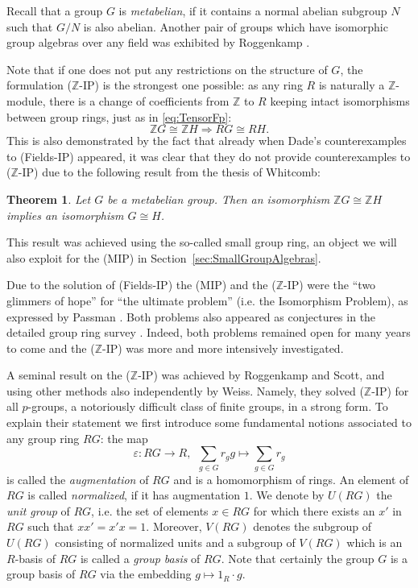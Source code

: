 \documentclass[11pt, a4paper]{amsart}
\newtheorem{theorem}{Theorem}[section]
\theoremstyle{definition}
\begin{document}
Recall that a group $G$ is \emph{metabelian}, if it contains a normal abelian subgroup $N$ such that $G/N$ is also abelian. Another pair of groups which have isomorphic group algebras over any field was exhibited by Roggenkamp \cite[Chapter VIII]{RoggenkampTaylor}.

Note that if one does not put any restrictions on the structure of $G$, the formulation ($\mathbb{Z}$-IP) is the strongest one possible: as any ring $R$ is naturally a $\mathbb{Z}$-module, there is a change of coefficients from $\mathbb{Z}$ to $R$ keeping intact isomorphisms between group rings, just as in \eqref{eq:TensorFp}:
\[\mathbb{Z}G \cong \mathbb{Z}H \Rightarrow RG \cong  RH. \]
This is also demonstrated by the fact that already when Dade's counterexamples to (Fields-IP) appeared, it was clear that they do not provide counterexamples to ($\mathbb{Z}$-IP) due to the following result from the thesis of Whitcomb:

\begin{theorem}\cite{Whitcomb} 
Let $G$ be a metabelian group. Then an isomorphism $\mathbb{Z}G \cong \mathbb{Z}H$ implies an isomorphism $G \cong H$.
\end{theorem}

This result was achieved using the so-called small group ring, an object we will also exploit for the (MIP) in Section~\ref{sec:SmallGroupAlgebras}.

Due to the solution of (Fields-IP) the (MIP) and the ($\mathbb{Z}$-IP) were the ``two glimmers of hope'' for ``the ultimate problem'' (i.e. the Isomorphism Problem), as expressed by Passman \cite{PassmanAlgebraicStructure}. Both problems also appeared as conjectures in the detailed group ring survey \cite{ZalesskiiMihalev73}. Indeed, both problems remained open for many years to come and the ($\mathbb{Z}$-IP) was more and more intensively investigated.

A seminal result on the ($\mathbb{Z}$-IP) was achieved by Roggenkamp and Scott, and using other methods also independently by Weiss. Namely, they solved ($\mathbb{Z}$-IP) for all $p$-groups, a notoriously difficult class of finite groups, in a strong form. To explain their statement we first introduce some fundamental notions associated to any group ring $RG$: the map
\[\varepsilon: RG \rightarrow R, \ \ \sum_{g \in G} r_g g \mapsto \sum_{g \in G} r_g \]
is called the \emph{augmentation} of $RG$ and is a homomorphism of rings. An element of $RG$ is called \emph{normalized}, if it has augmentation $1$. We denote by $U(RG)$ the \emph{unit group} of $RG$, i.e. the set of elements $x \in RG$ for which there exists an $x'$ in $RG$ such that $xx' = x'x = 1$. Moreover, $V(RG)$ denotes the subgroup of $U(RG)$ consisting of normalized units and a subgroup of $V(RG)$ which is an $R$-basis of $RG$ is called a \emph{group basis} of $RG$. Note that certainly the group $G$ is a group basis of $RG$ via the embedding $g \mapsto 1_R \cdot g$.
\end{document}
